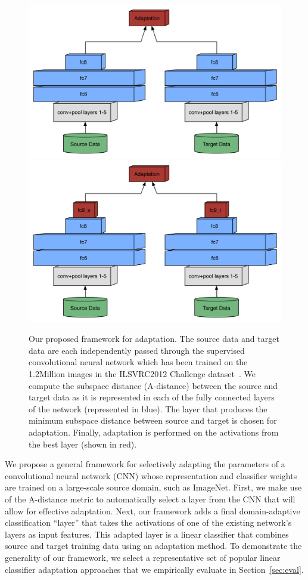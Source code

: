 \newcommand{\svmT}{\bm{\theta}}
\newcommand{\svmB}{b}
\newcommand{\svmAug}{\tilde{\svmT}}
\newcommand{\svmAugAll}{\bm{\Theta}}

\begin{figure}
\begin{center}
\includegraphics[width=.45\linewidth]{figs/model-adapt-unsuper}
\includegraphics[width=.45\linewidth]{figs/model-adapt-super}
\end{center}
\caption{Our proposed framework for adaptation. The source data and target data are each independently passed through the supervised convolutional neural network which has been trained on the 1.2Million images in the ILSVRC2012 Challenge dataset~\cite{ilsvrc2012}. We compute the subspace distance (A-distance) between the source and target data as it is represented in each of the fully connected layers of the network (represented in blue). The layer that produces the minimum subspace distance between source and target is chosen for adaptation. Finally, adaptation is performed on the activations from the best layer (shown in red).}
\label{fig:model}
\end{figure}


We propose a general framework for selectively adapting the parameters of a
convolutional neural network (CNN) whose representation and classifier weights
are trained on a large-scale source domain, such as ImageNet. First, we make use
of the A-distance metric  to automatically select a layer
from the CNN that will allow for effective adaptation. Next, our framework adds
a final domain-adaptive classification ``layer'' that takes the activations of
one of the existing network's layers as input features. This adapted layer is a
linear classifier that combines source and target training data using an
adaptation method. To demonstrate the generality of our framework, we select a
representative set of popular linear classifier adaptation approaches that we
empirically evaluate in Section~\ref{sec:eval}.

